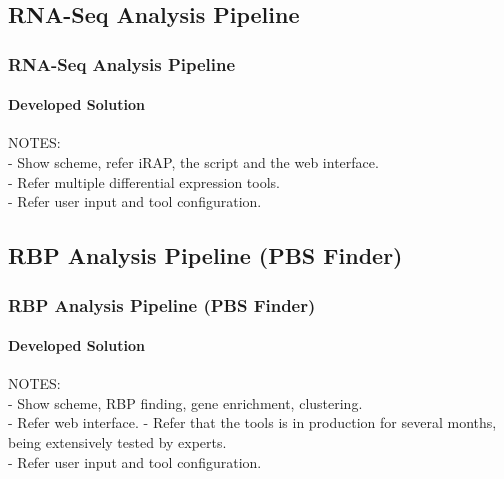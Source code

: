 \documentclass{beamer}
\begin{document}
\subsection{RNA-Seq Analysis Pipeline}
\begin{frame}
  \frametitle{RNA-Seq Analysis Pipeline}
  \framesubtitle{Developed Solution}

NOTES:\\
- Show scheme, refer iRAP, the script and the web interface.\\
- Refer multiple differential expression tools.\\
- Refer user input and tool configuration.\\

\end{frame}

\subsection{RBP Analysis Pipeline (PBS Finder)}
\begin{frame}
  \frametitle{RBP Analysis Pipeline (PBS Finder)}
  \framesubtitle{Developed Solution}

NOTES:\\
- Show scheme, RBP finding, gene enrichment, clustering.\\
- Refer web interface.
- Refer that the tools is in production for several months, being extensively tested by experts.\\
- Refer user input and tool configuration.\\

\end{frame}
\end{document}

